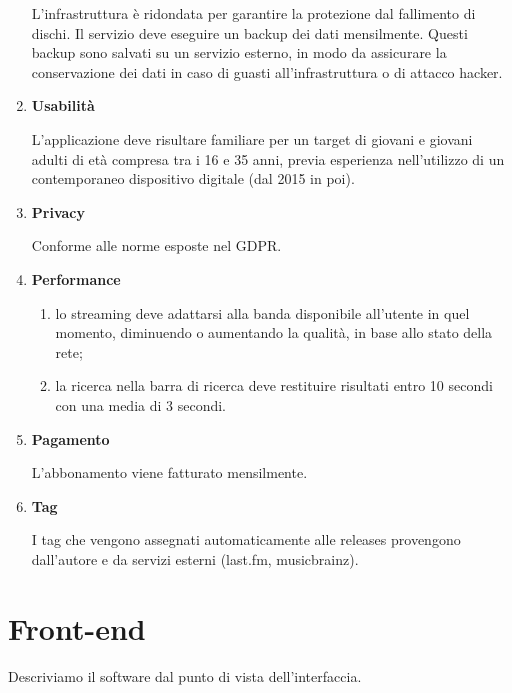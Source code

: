 \documentclass[a4paper,12pt]{article}
\begin{document}
\begin{enumerate}[label=\textbf{RNF\arabic*}\;, ref=\textbf{RNF\arabic*}]
    L’infrastruttura è ridondata per garantire la protezione dal fallimento di dischi. Il servizio deve eseguire un backup dei dati mensilmente. Questi backup sono salvati su un servizio esterno, in modo da assicurare la conservazione dei dati in caso di guasti all’infrastruttura o di attacco hacker.
    \item \label{usabilità} \textbf{Usabilità}
    
    L’applicazione deve risultare familiare per un target di giovani e giovani adulti di età compresa tra i 16 e 35 anni, previa esperienza nell’utilizzo di un contemporaneo dispositivo digitale (dal 2015 in poi).
    \item \label{privacy} \textbf{Privacy}
    
    Conforme alle norme esposte nel GDPR.
    \item \label{performance} \textbf{Performance}
    
    \begin{enumerate}[label=\textbf{\alph*}, ref=\textbf{RNF6\alph*}, itemsep=0.5em]
        \item \label{qualità streaming} lo streaming deve adattarsi alla banda disponibile all’utente in quel momento, diminuendo o aumentando la qualità, in base allo stato della rete;
        \item \label{velocità ricerca} la ricerca nella barra di ricerca deve restituire risultati entro 10 secondi con una media di 3 secondi.
    \end{enumerate}

    \item \label{pagamento non funzionale} \textbf{Pagamento}
    
    L’abbonamento viene fatturato mensilmente.
    \item \label{tag} \textbf{Tag}
    
    I tag che vengono assegnati automaticamente alle releases provengono dall’autore e da servizi esterni (last.fm, musicbrainz).
\end{enumerate}

\section{Front-end}

Descriviamo il software dal punto di vista dell'interfaccia.
\end{document}
